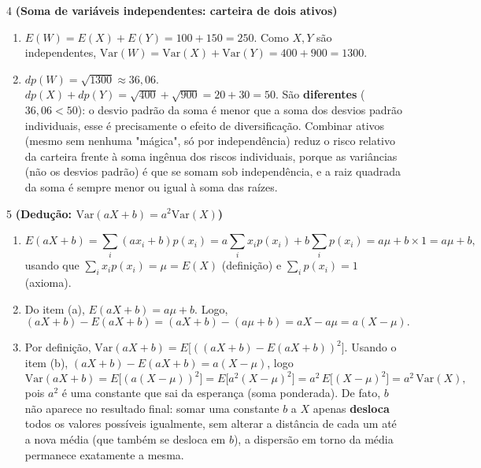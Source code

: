 \documentclass[11pt]{article}
\begin{document}
\begin{questao}{4} \textbf{(Soma de variáveis independentes: carteira de dois ativos)}
\begin{solucao}
\begin{enumerate}[label=(\alph*)]
  \item $E(W)=E(X)+E(Y)=100+150=250$. Como $X,Y$ são independentes,
    $\mathrm{Var}(W)=\mathrm{Var}(X)+\mathrm{Var}(Y)=400+900=1300$.
  \item $dp(W)=\sqrt{1300}\approx 36{,}06$. $dp(X)+dp(Y) = \sqrt{400}+\sqrt{900}=20+30=50$.
    São \textbf{diferentes} ($36{,}06 < 50$): o desvio padrão da soma é menor que a soma dos
    desvios padrão individuais, esse é precisamente o efeito de diversificação. Combinar ativos
    (mesmo sem nenhuma "mágica", só por independência) reduz o risco relativo da carteira frente à
    soma ingênua dos riscos individuais, porque as variâncias (não os desvios padrão) é que se
    somam sob independência, e a raiz quadrada da soma é sempre menor ou igual à soma das raízes.
\end{enumerate}
\end{solucao}
\end{questao}

\begin{questao}{5} \textbf{(Dedução: $\mathrm{Var}(aX+b)=a^2\mathrm{Var}(X)$)}
\begin{solucao}
\begin{enumerate}[label=(\alph*)]
  \item
  $$
  E(aX+b) = \sum_i (ax_i+b)p(x_i) = a\sum_i x_i p(x_i) + b\sum_i p(x_i) = a\mu + b\times 1 = a\mu+b,
  $$
  usando que $\sum_i x_ip(x_i)=\mu=E(X)$ (definição) e $\sum_i p(x_i)=1$ (axioma).
  \item Do item (a), $E(aX+b)=a\mu+b$. Logo,
  $$
  (aX+b) - E(aX+b) = (aX+b) - (a\mu+b) = aX - a\mu = a(X-\mu).
  $$
  \item Por definição, $\mathrm{Var}(aX+b) = E\big[((aX+b)-E(aX+b))^2\big]$. Usando o item (b),
    $(aX+b)-E(aX+b) = a(X-\mu)$, logo
  $$
  \mathrm{Var}(aX+b) = E\big[(a(X-\mu))^2\big] = E\big[a^2(X-\mu)^2\big] = a^2\,E\big[(X-\mu)^2\big]
  = a^2\,\mathrm{Var}(X),
  $$
  pois $a^2$ é uma constante que sai da esperança (soma ponderada). De fato, $b$ não aparece no
  resultado final: somar uma constante $b$ a $X$ apenas \textbf{desloca} todos os valores possíveis
  igualmente, sem alterar a distância de cada um até a nova média (que também se desloca em $b$),
  a dispersão em torno da média permanece exatamente a mesma.
\end{enumerate}
\end{solucao}
\end{questao}
\end{document}
